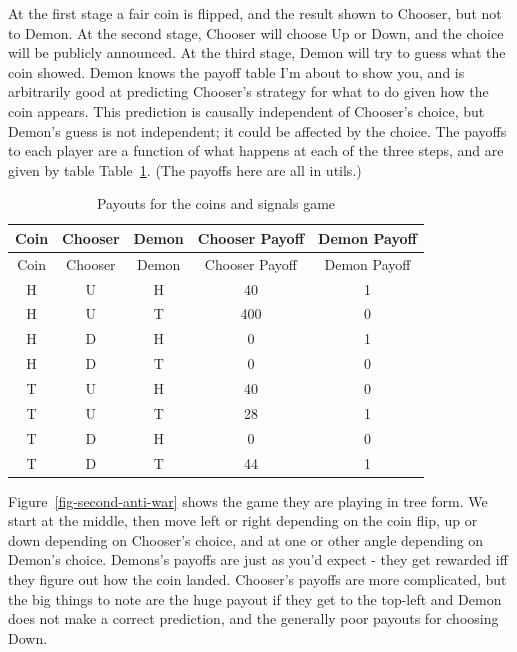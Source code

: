 \documentclass[
  12pt,
  letterpaper,
  DIV=11,
  numbers=noendperiod]{scrreprt}
\begin{document}
At the first stage a fair coin is flipped, and the result shown to
Chooser, but not to Demon. At the second stage, Chooser will choose Up
or Down, and the choice will be publicly announced. At the third stage,
Demon will try to guess what the coin showed. Demon knows the payoff
table I'm about to show you, and is arbitrarily good at predicting
Chooser's strategy for what to do given how the coin appears. This
prediction is causally independent of Chooser's choice, but Demon's
guess is not independent; it could be affected by the choice. The
payoffs to each player are a function of what happens at each of the
three steps, and are given by table Table~\ref{tbl-payoffs-demon-coin}.
(The payoffs here are all in utils.)

\hypertarget{tbl-payoffs-demon-coin}{}
\begin{longtable}[]{@{}ccccc@{}}
\caption{\label{tbl-payoffs-demon-coin}Payouts for the coins and signals
game}\tabularnewline
\toprule\noalign{}
Coin & Chooser & Demon & Chooser Payoff & Demon Payoff \\
\midrule\noalign{}
\endfirsthead
\toprule\noalign{}
Coin & Chooser & Demon & Chooser Payoff & Demon Payoff \\
\midrule\noalign{}
\endhead
\bottomrule\noalign{}
\endlastfoot
H & U & H & 40 & 1 \\
H & U & T & 400 & 0 \\
H & D & H & 0 & 1 \\
H & D & T & 0 & 0 \\
T & U & H & 40 & 0 \\
T & U & T & 28 & 1 \\
T & D & H & 0 & 0 \\
T & D & T & 44 & 1 \\
\end{longtable}

Figure~\ref{fig-second-anti-war} shows the game they are playing in tree
form. We start at the middle, then move left or right depending on the
coin flip, up or down depending on Chooser's choice, and at one or other
angle depending on Demon's choice. Demons's payoffs are just as you'd
expect - they get rewarded iff they figure out how the coin landed.
Chooser's payoffs are more complicated, but the big things to note are
the huge payout if they get to the top-left and Demon does not make a
correct prediction, and the generally poor payouts for choosing Down.
\end{document}
